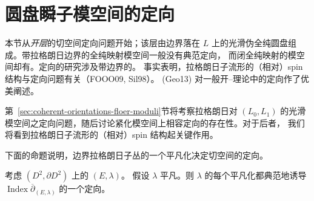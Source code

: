 \section{圆盘瞬子模空间的定向}
\label{sec:orientation-disc-instantons}

本节从\emph{开层}的切空间定向问题开始；该层由边界落在\termLagrangianSubmanifold{}
$L$ 上的光滑伪全纯圆盘组成。带拉格朗日边界的全纯映射模空间一般没有典范定向，
而闭全纯映射的模空间却有。定向的研究涉及带边界的\termFamilyIndexTheory{}。
事实表明，拉格朗日子流形的（相对）spin 结构与定向问题有关（FOOO09, Sil98）。\personPenkaGeorgieva{} (Geo13) 对一般开\personGromov{}--\personWitten{}理论中的定向作了优美阐述。

第~\ref{sec:coherent-orientations-floer-moduli}节将考察拉格朗日对 $(L_0,L_1)$
的光滑\personFloer{}模空间之定向问题，随后讨论紧化模空间上相容定向的存在性。对于后者，
我们将看到拉格朗日子流形的（相对）spin 结构起关键作用。

下面的命题说明，边界拉格朗日子丛的一个平凡化决定切空间的定向。

\begin{proposition}
\label{prop:trivial-boundary-orients-disc-index}
考虑 $(D^2,\partial D^2)$ 上的\termComplexBundlePair{} $(E,\lambda)$。
假设 $\lambda$ 平凡。则 $\lambda$ 的每个平凡化都典范地诱导
$\operatorname{Index}\overline\partial_{(E,\lambda)}$ 的一个定向。
\end{proposition}

